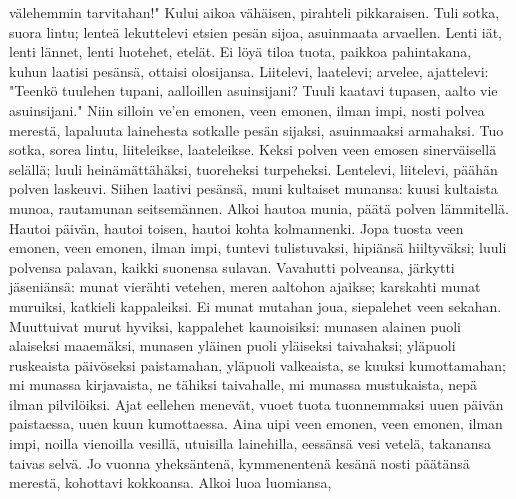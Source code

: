     välehemmin tarvitahan!"
  \endverse
  \beginverse
    Kului aikoa vähäisen,
    pirahteli pikkaraisen.
    Tuli sotka, suora lintu;
    lenteä lekuttelevi
  \endverse
  \beginverse
    etsien pesän sijoa,
    asuinmaata arvaellen.
    Lenti iät, lenti lännet,
    lenti luotehet, etelät.
    Ei löyä tiloa tuota,
    paikkoa pahintakana,
    kuhun laatisi pesänsä,
    ottaisi olosijansa.
  \endverse
  \beginverse
    Liitelevi, laatelevi;
    arvelee, ajattelevi:
  \endverse
  \beginverse
    "Teenkö tuulehen tupani,
    aalloillen asuinsijani?
    Tuuli kaatavi tupasen,
    aalto vie asuinsijani."
    Niin silloin ve'en emonen,
    veen emonen, ilman impi,
    nosti polvea merestä,
    lapaluuta lainehesta
    sotkalle pesän sijaksi,
    asuinmaaksi armahaksi.
  \endverse
  \beginverse
    Tuo sotka, sorea lintu,
    liiteleikse, laateleikse.
    Keksi polven veen emosen
    sinerväisellä selällä;
    luuli heinämättähäksi,
    tuoreheksi turpeheksi.
    Lentelevi, liitelevi,
    päähän polven laskeuvi.
    Siihen laativi pesänsä,
    muni kultaiset munansa:
  \endverse
  \beginverse
    kuusi kultaista munoa,
    rautamunan seitsemännen.
  \endverse
  \beginverse
    Alkoi hautoa munia,
    päätä polven lämmitellä.
    Hautoi päivän, hautoi toisen,
    hautoi kohta kolmannenki.
    Jopa tuosta veen emonen,
    veen emonen, ilman impi,
    tuntevi tulistuvaksi,
    hipiänsä hiiltyväksi;
  \endverse
  \beginverse
    luuli polvensa palavan,
    kaikki suonensa sulavan.
    Vavahutti polveansa,
    järkytti jäseniänsä:
    munat vierähti vetehen,
    meren aaltohon ajaikse;
    karskahti munat muruiksi,
    katkieli kappaleiksi.
  \endverse
  \beginverse
    Ei munat mutahan joua,
    siepalehet veen sekahan.
  \endverse
  \beginverse
    Muuttuivat murut hyviksi,
    kappalehet kaunoisiksi:
    munasen alainen puoli
    alaiseksi maaemäksi,
    munasen yläinen puoli
    yläiseksi taivahaksi;
    yläpuoli ruskeaista
    päivöseksi paistamahan,
    yläpuoli valkeaista,
    se kuuksi kumottamahan;
    mi munassa kirjavaista,
    ne tähiksi taivahalle,
    mi munassa mustukaista,
    nepä ilman pilvilöiksi.
  \endverse
  \beginverse
    Ajat eellehen menevät,
    vuoet tuota tuonnemmaksi
    uuen päivän paistaessa,
    uuen kuun kumottaessa.
    Aina uipi veen emonen,
    veen emonen, ilman impi,
  \endverse
  \beginverse
    noilla vienoilla vesillä,
    utuisilla lainehilla,
    eessänsä vesi vetelä,
    takanansa taivas selvä.
    Jo vuonna yheksäntenä,
    kymmenentenä kesänä
    nosti päätänsä merestä,
    kohottavi kokkoansa.
    Alkoi luoa luomiansa,
